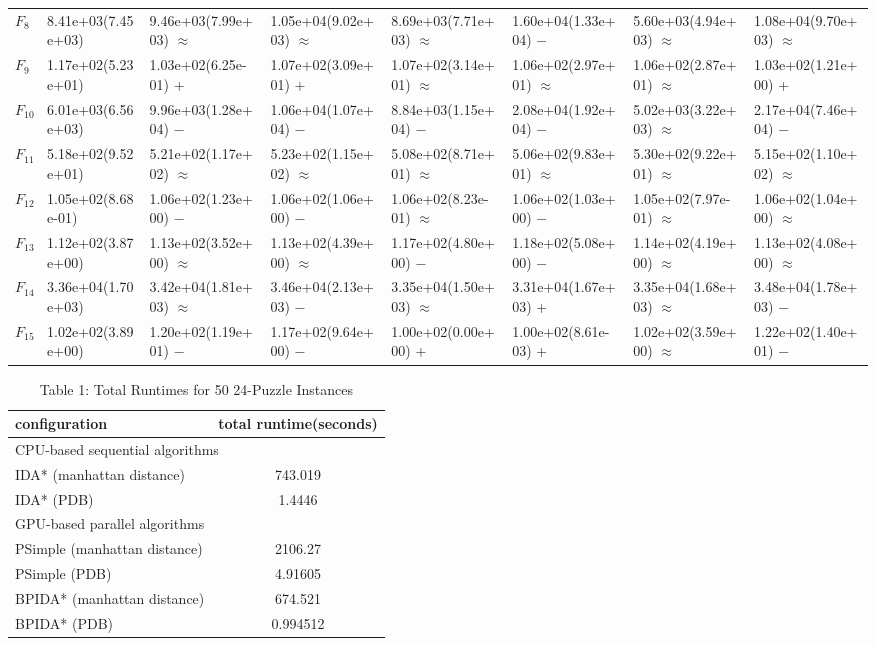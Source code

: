 \documentclass[a4paper,11pt,oneside,openany]{jsbook}
\begin{document}
\begin{landscape}
\begin{table}[!tbp]
\begin{center}
\begin{tabular}{llllllll}
$F_{8}$&8.41e+03(7.45e+03)&9.46e+03(7.99e+03) $\approx$&1.05e+04(9.02e+03) $\approx$&8.69e+03(7.71e+03) $\approx$&1.60e+04(1.33e+04) −&5.60e+03(4.94e+03) $\approx$&1.08e+04(9.70e+03) $\approx$\tabularnewline
$F_{9}$&1.17e+02(5.23e+01)&1.03e+02(6.25e-01) +&1.07e+02(3.09e+01) +&1.07e+02(3.14e+01) $\approx$&1.06e+02(2.97e+01) $\approx$&1.06e+02(2.87e+01) $\approx$&1.03e+02(1.21e+00) +\tabularnewline
$F_{10}$&6.01e+03(6.56e+03)&9.96e+03(1.28e+04) −&1.06e+04(1.07e+04) −&8.84e+03(1.15e+04) −&2.08e+04(1.92e+04) −&5.02e+03(3.22e+03) $\approx$&2.17e+04(7.46e+04) −\tabularnewline
$F_{11}$&5.18e+02(9.52e+01)&5.21e+02(1.17e+02) $\approx$&5.23e+02(1.15e+02) $\approx$&5.08e+02(8.71e+01) $\approx$&5.06e+02(9.83e+01) $\approx$&5.30e+02(9.22e+01) $\approx$&5.15e+02(1.10e+02) $\approx$\tabularnewline
$F_{12}$&1.05e+02(8.68e-01)&1.06e+02(1.23e+00) −&1.06e+02(1.06e+00) −&1.06e+02(8.23e-01) $\approx$&1.06e+02(1.03e+00) −&1.05e+02(7.97e-01) $\approx$&1.06e+02(1.04e+00) $\approx$\tabularnewline
$F_{13}$&1.12e+02(3.87e+00)&1.13e+02(3.52e+00) $\approx$&1.13e+02(4.39e+00) $\approx$&1.17e+02(4.80e+00) −&1.18e+02(5.08e+00) −&1.14e+02(4.19e+00) $\approx$&1.13e+02(4.08e+00) $\approx$\tabularnewline
$F_{14}$&3.36e+04(1.70e+03)&3.42e+04(1.81e+03) $\approx$&3.46e+04(2.13e+03) −&3.35e+04(1.50e+03) $\approx$&3.31e+04(1.67e+03) +&3.35e+04(1.68e+03) $\approx$&3.48e+04(1.78e+03) −\tabularnewline
$F_{15}$&1.02e+02(3.89e+00)&1.20e+02(1.19e+01) −&1.17e+02(9.64e+00) −&1.00e+02(0.00e+00) +&1.00e+02(8.61e-03) +&1.02e+02(3.59e+00) $\approx$&1.22e+02(1.40e+01) −\tabularnewline
\hline
\end{tabular}\end{center}

\end{table}
\end{landscape}
\newpage

\begin{table}[]
\centering
\caption{Table 1: Total Runtimes for 50 24-Puzzle Instances}
\label{my-label}
\begin{tabular}{|l|c|}
\hline
configuration & \multicolumn{1}{l|}{total runtime(seconds)} \\ \hline
\multicolumn{2}{|l|}{CPU-based sequential algorithms} \\ \hline
IDA* (manhattan distance) & 743.019 \\
IDA* (PDB) & 1.4446 \\ \hline
\multicolumn{2}{|l|}{GPU-based parallel algorithms} \\ \hline
PSimple (manhattan distance) & 2106.27 \\
PSimple (PDB) & 4.91605 \\
BPIDA* (manhattan distance) & 674.521 \\
BPIDA* (PDB) & 0.994512 \\ \hline
\end{tabular}
\end{table}
\end{document}
